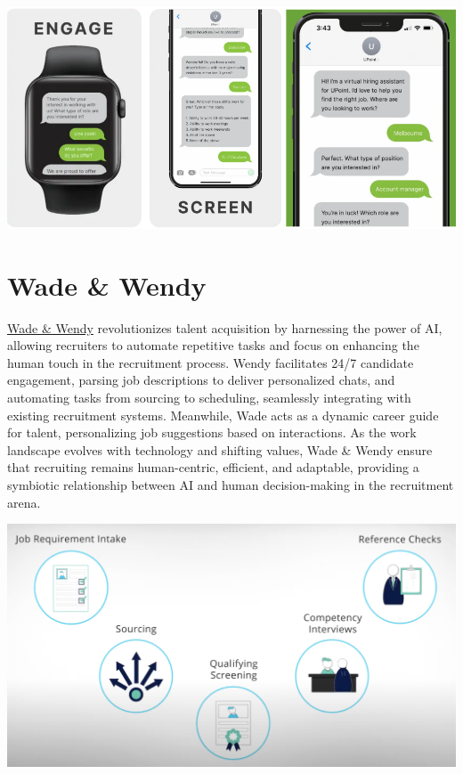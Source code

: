 \documentclass[
]{book}
\begin{document}
\includegraphics[width=5.57292in,height=\textheight]{hirevue pic.png}

\hypertarget{wade-wendy}{%
\section{Wade \& Wendy}\label{wade-wendy}}

\href{https://wadeandwendy.ai/}{Wade \& Wendy} revolutionizes talent acquisition by harnessing the power of AI, allowing recruiters to automate repetitive tasks and focus on enhancing the human touch in the recruitment process. Wendy facilitates 24/7 candidate engagement, parsing job descriptions to deliver personalized chats, and automating tasks from sourcing to scheduling, seamlessly integrating with existing recruitment systems. Meanwhile, Wade acts as a dynamic career guide for talent, personalizing job suggestions based on interactions. As the work landscape evolves with technology and shifting values, Wade \& Wendy ensure that recruiting remains human-centric, efficient, and adaptable, providing a symbiotic relationship between AI and human decision-making in the recruitment arena.

\includegraphics[width=5.45833in,height=\textheight]{wadewendy pic.png}
\end{document}
